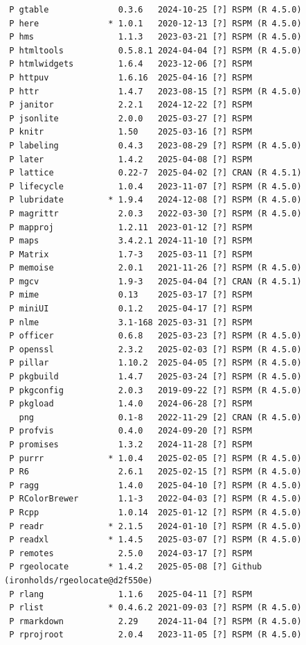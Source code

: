 \documentclass[
  12pt,
]{article}
\begin{document}
\begin{verbatim}
 P gtable              0.3.6   2024-10-25 [?] RSPM (R 4.5.0)
 P here              * 1.0.1   2020-12-13 [?] RSPM (R 4.5.0)
 P hms                 1.1.3   2023-03-21 [?] RSPM (R 4.5.0)
 P htmltools           0.5.8.1 2024-04-04 [?] RSPM (R 4.5.0)
 P htmlwidgets         1.6.4   2023-12-06 [?] RSPM
 P httpuv              1.6.16  2025-04-16 [?] RSPM
 P httr                1.4.7   2023-08-15 [?] RSPM (R 4.5.0)
 P janitor             2.2.1   2024-12-22 [?] RSPM
 P jsonlite            2.0.0   2025-03-27 [?] RSPM
 P knitr               1.50    2025-03-16 [?] RSPM
 P labeling            0.4.3   2023-08-29 [?] RSPM (R 4.5.0)
 P later               1.4.2   2025-04-08 [?] RSPM
 P lattice             0.22-7  2025-04-02 [?] CRAN (R 4.5.1)
 P lifecycle           1.0.4   2023-11-07 [?] RSPM (R 4.5.0)
 P lubridate         * 1.9.4   2024-12-08 [?] RSPM (R 4.5.0)
 P magrittr            2.0.3   2022-03-30 [?] RSPM (R 4.5.0)
 P mapproj             1.2.11  2023-01-12 [?] RSPM
 P maps                3.4.2.1 2024-11-10 [?] RSPM
 P Matrix              1.7-3   2025-03-11 [?] RSPM
 P memoise             2.0.1   2021-11-26 [?] RSPM (R 4.5.0)
 P mgcv                1.9-3   2025-04-04 [?] CRAN (R 4.5.1)
 P mime                0.13    2025-03-17 [?] RSPM
 P miniUI              0.1.2   2025-04-17 [?] RSPM
 P nlme                3.1-168 2025-03-31 [?] RSPM
 P officer             0.6.8   2025-03-23 [?] RSPM (R 4.5.0)
 P openssl             2.3.2   2025-02-03 [?] RSPM (R 4.5.0)
 P pillar              1.10.2  2025-04-05 [?] RSPM (R 4.5.0)
 P pkgbuild            1.4.7   2025-03-24 [?] RSPM (R 4.5.0)
 P pkgconfig           2.0.3   2019-09-22 [?] RSPM (R 4.5.0)
 P pkgload             1.4.0   2024-06-28 [?] RSPM
   png                 0.1-8   2022-11-29 [2] CRAN (R 4.5.0)
 P profvis             0.4.0   2024-09-20 [?] RSPM
 P promises            1.3.2   2024-11-28 [?] RSPM
 P purrr             * 1.0.4   2025-02-05 [?] RSPM (R 4.5.0)
 P R6                  2.6.1   2025-02-15 [?] RSPM (R 4.5.0)
 P ragg                1.4.0   2025-04-10 [?] RSPM (R 4.5.0)
 P RColorBrewer        1.1-3   2022-04-03 [?] RSPM (R 4.5.0)
 P Rcpp                1.0.14  2025-01-12 [?] RSPM (R 4.5.0)
 P readr             * 2.1.5   2024-01-10 [?] RSPM (R 4.5.0)
 P readxl            * 1.4.5   2025-03-07 [?] RSPM (R 4.5.0)
 P remotes             2.5.0   2024-03-17 [?] RSPM
 P rgeolocate        * 1.4.2   2025-05-08 [?] Github (ironholds/rgeolocate@d2f550e)
 P rlang               1.1.6   2025-04-11 [?] RSPM
 P rlist             * 0.4.6.2 2021-09-03 [?] RSPM (R 4.5.0)
 P rmarkdown           2.29    2024-11-04 [?] RSPM (R 4.5.0)
 P rprojroot           2.0.4   2023-11-05 [?] RSPM (R 4.5.0)

\end{verbatim}
\end{document}
